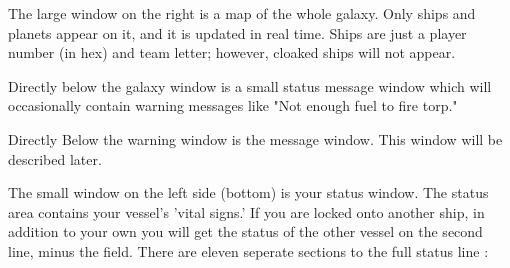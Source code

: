 The large window on the right is a map of the whole galaxy.
Only ships and planets appear on it, and it is updated in real time.
Ships are just a player number (in hex) and team letter; however, cloaked
ships will not appear.

Directly below the galaxy window is a small status message window which will
occasionally contain warning messages like "Not enough fuel to fire
torp." 

Directly Below the warning window is the message window.  This window
will be described later.

The small window on the left side (bottom) is your status window.  
The status area contains your vessel's 'vital signs.'
If you are locked onto another ship, in addition to your own you
will get the status of the other vessel on the second line, minus
the  field. There are eleven seperate sections to the
full status line :

